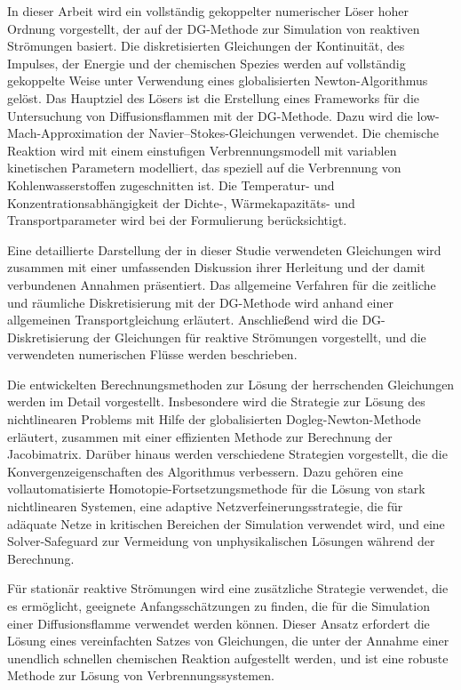 \glsresetall
In dieser Arbeit wird ein vollständig gekoppelter numerischer Löser hoher Ordnung vorgestellt, der auf der \Gls{DG}-Methode zur Simulation von reaktiven Strömungen basiert. Die diskretisierten Gleichungen der Kontinuität, des Impulses, der Energie und der chemischen Spezies werden auf vollständig gekoppelte Weise unter Verwendung eines globalisierten Newton-Algorithmus gelöst. Das Hauptziel des Lösers ist die Erstellung eines Frameworks für die Untersuchung von Diffusionsflammen mit der \Gls{DG}-Methode. Dazu wird die low-Mach-Approximation der Navier--Stokes-Gleichungen verwendet. Die chemische Reaktion wird mit einem einstufigen Verbrennungsmodell mit variablen kinetischen Parametern modelliert, das speziell auf die Verbrennung von Kohlenwasserstoffen zugeschnitten ist. Die Temperatur- und Konzentrationsabhängigkeit der Dichte-, Wärmekapazitäts- und Transportparameter wird bei der Formulierung berücksichtigt. 

Eine detaillierte Darstellung der in dieser Studie verwendeten Gleichungen wird zusammen mit einer umfassenden Diskussion ihrer Herleitung und der damit verbundenen Annahmen präsentiert.
Das allgemeine Verfahren für die zeitliche und räumliche Diskretisierung mit der DG-Methode wird anhand einer allgemeinen Transportgleichung erläutert. Anschließend wird die DG-Diskretisierung der Gleichungen für reaktive Strömungen vorgestellt, und die verwendeten numerischen Flüsse werden beschrieben. 

Die entwickelten Berechnungsmethoden zur Lösung der herrschenden Gleichungen werden im Detail vorgestellt. Insbesondere wird die Strategie zur Lösung des nichtlinearen Problems mit Hilfe der globalisierten Dogleg-Newton-Methode erläutert, zusammen mit einer effizienten Methode zur Berechnung der Jacobimatrix. Darüber hinaus werden verschiedene Strategien vorgestellt, die die Konvergenzeigenschaften des Algorithmus verbessern. Dazu gehören eine vollautomatisierte Homotopie-Fortsetzungsmethode für die Lösung von stark nichtlinearen Systemen, eine adaptive Netzverfeinerungsstrategie, die für adäquate Netze in kritischen Bereichen der Simulation verwendet wird, und eine Solver-Safeguard zur Vermeidung von unphysikalischen Lösungen während der Berechnung. 

Für stationär reaktive Strömungen wird eine zusätzliche Strategie verwendet, die es ermöglicht, geeignete Anfangsschätzungen zu finden, die für die Simulation einer Diffusionsflamme verwendet werden können. Dieser Ansatz erfordert die Lösung eines vereinfachten Satzes von Gleichungen, die unter der Annahme einer unendlich schnellen chemischen Reaktion aufgestellt werden, und ist eine robuste Methode zur Lösung von Verbrennungssystemen.

